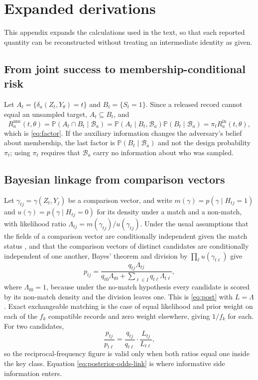 \documentclass[11pt,a4paper]{article}
\theoremstyle{plain}
\theoremstyle{definition}
\theoremstyle{definition}
\theoremstyle{plain}
\newcommand{\Prob}{\mathbb{P}}
\begin{document}
\section{Expanded derivations}\label{app:derivations}

This appendix expands the calculations used in the text, so that each reported
quantity can be reconstructed without treating an intermediate identity as
given.

\subsection{From joint success to membership-conditional risk}

Let $A_t=\{\delta_a(Z_t,Y_\theta)=t\}$ and $B_t=\{S_t=1\}$. Since a released
record cannot equal an unsampled target, $A_t\subseteq B_t$, and
\begin{equation}
R_a^{\mathrm{unc}}(t,\theta)
 =\Prob(A_t\cap B_t\mid\mathcal{B}_a)
 =\Prob(A_t\mid B_t,\mathcal{B}_a)\Prob(B_t\mid\mathcal{B}_a)
 =\pi_t R_a^{\mathrm{in}}(t,\theta),
\end{equation}
which is \eqref{eq:factor}. If the auxiliary information changes the adversary's
belief about membership, the last factor is $\Prob(B_t\mid\mathcal{B}_a)$ and not
the design probability $\pi_t$; using $\pi_t$ requires that $\mathcal{B}_a$ carry
no information about who was sampled.

\subsection{Bayesian linkage from comparison vectors}

Let $\gamma_{tj}=\gamma(Z_t,Y_j)$ be a comparison vector, and write
$m(\gamma)=p(\gamma\mid H_{tj}=1)$ and $u(\gamma)=p(\gamma\mid H_{tj}=0)$ for its
density under a match and a non-match, with likelihood ratio
$\Lambda_{tj}=m(\gamma_{tj})/u(\gamma_{tj})$. Under the usual assumptions that the fields of a comparison vector are
conditionally independent given the match status \citep{fellegi1969}, and that the
comparison vectors of distinct candidates are conditionally independent of one
another, Bayes' theorem and division by $\prod_\ell u(\gamma_{t\ell})$ give
\begin{equation}
p_{tj}=\frac{q_{tj}\Lambda_{tj}}
 {q_{t0}\Lambda_{t0}+\sum_{\ell\in I}q_{t\ell}\Lambda_{t\ell}},
\end{equation}
where $\Lambda_{t0}=1$, because under the no-match hypothesis every candidate is
scored by its non-match density and the division leaves one. This is
\eqref{eq:post} with $L=\Lambda$. Exact exchangeable matching is the case
of equal likelihood and prior weight on each of the $f_k$ compatible records and
zero weight elsewhere, giving $1/f_k$ for each. For two candidates,
\begin{equation}
\frac{p_{tj}}{p_{t\ell}}
=\frac{q_{tj}}{q_{t\ell}}\cdot\frac{L_{tj}}{L_{t\ell}} ,
\label{eq:posterior-odds-link}
\end{equation}
so the reciprocal-frequency figure is valid only when both ratios equal one inside
the key class. Equation \eqref{eq:posterior-odds-link} is where informative side
information enters.
\end{document}
